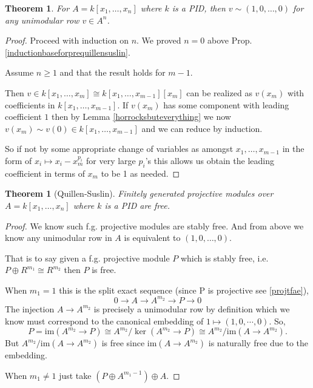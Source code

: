 \documentclass[12pt]{article}
\numberwithin{equation}{section}
\newcounter{dummy} \numberwithin{dummy}{section}
\newtheorem{theorem}[dummy]{Theorem}
\begin{document}
	\begin{theorem}
		For $A=k[x_1, \dots, x_n]$ where $k $ is a PID, then $v \sim (1,0,\dots, 0)$ for any unimodular row $v \in A^n$.
	\end{theorem}
	\begin{proof}
		Proceed with induction on $n$. We proved $n=0$ above Prop. \ref{inductionbaseforprequillensuslin}.
		
		Assume $n\geq 1$ and that the result holds for $m-1$.
		
		Then $v \in k[x_1, \dots, x_m] \cong k[x_1,\dots, x_{m-1}] [x_m]$ can be realized as $v(x_m) $ with coefficients in $k[x_1,\dots, x_{m-1}]$. If $v(x_m)$ has some component with leading coefficient $1$ then by Lemma \ref{horrocksbuteverything} we now $v(x_m) \sim v(0) \in k[x_1, \dots, x_{m-1}]$ and we can reduce by induction.
		
		So if not by some appropriate change of variables as amongst $x_1, \dots, x_{m-1}$ in the form of $x_i \mapsto x_i-x_m^{p_i}$ for very large $p_i$'s this allows us obtain the leading coefficient in terms of $x_m$ to be 1 as needed.
	\end{proof}

	
	
	\begin{theorem}[Quillen-Suslin]
		Finitely generated projective modules over $A=k[x_1,\dots,x_n]$ where $k$ is a PID are free.
	\end{theorem}
	\begin{proof}
		We know such f.g. projective modules are stably free. And from above we know any unimodular row in $A$ is equivalent to $(1,0,\dots,0)$.
		
		That is to say given a f.g. projective module $P$ which is stably free, i.e. $P \oplus R^{m_1} \cong R^{m_2}$ then $P$ is free.
		
		When $m_1=1$ this is the split exact sequence (since P is projective see \ref{projtfae}),
		\[ 0 \to A \to A^{m_2}  \to P \to 0 \]
		The injection $A \to A^{m_2}$ is precisely a unimodular row by definition which we know must correspond to the canonical embedding of $1 \mapsto (1,0,\cdots, 0)$.
		So,$$P = \mathrm{im}(A^{m_2} \to P) \cong A^{m_2}/\ker (A^{m_2} \to P) \cong A^{m_2}/\mathrm{im}(A \to A^{m_2}).$$
		But $A^{m_2}/\mathrm{im}(A \to A^{m_2})$ is free since $\mathrm{im}(A \to A^{m_2})$ is naturally free due to the embedding.
		
		When $m_1 \neq 1$ just take $(P \oplus A^{m_1-1}) \oplus A$.
	\end{proof}
\end{document}
